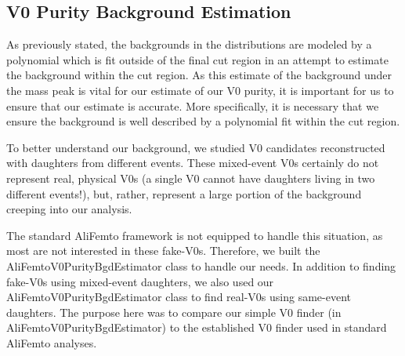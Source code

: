 \documentclass[/home/jesse/Analysis/FemtoAnalysis/AnalysisNotes/AnalysisNoteJBuxton.tex]{subfiles}
\begin{document}
\subsection{V0 Purity Background Estimation}
\label{V0PurBgdEst}

As previously stated, the backgrounds in the \minv distributions are modeled by a polynomial which is fit outside of the final cut region in an attempt to estimate the background within the cut region.  As this estimate of the background under the mass peak is vital for our estimate of our V0 purity, it is important for us to ensure that our estimate is accurate.  More specifically, it is necessary that we ensure the background is well described by a polynomial fit within the cut region.

To better understand our background, we studied V0 candidates reconstructed with daughters from different events.  These mixed-event V0s certainly do not represent real, physical V0s (a single V0 cannot have daughters living in two different events!), but, rather, represent a large portion of the background creeping into our analysis.

The standard AliFemto framework is not equipped to handle this situation, as most are not interested in these fake-V0s.  Therefore, we built the AliFemtoV0PurityBgdEstimator class to handle our needs.  In addition to finding fake-V0s using mixed-event daughters, we also used our AliFemtoV0PurityBgdEstimator class to find real-V0s using same-event daughters.  The purpose here was to compare our simple V0 finder (in AliFemtoV0PurityBgdEstimator) to the established V0 finder used in standard AliFemto analyses.
\end{document}
